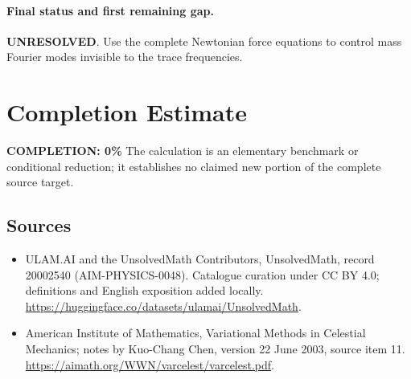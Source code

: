 \documentclass[11pt]{article}
\begin{document}
\paragraph{Final status and first remaining gap.}
\textbf{UNRESOLVED}. Use the complete Newtonian force equations to control mass Fourier modes invisible to the trace frequencies.

\section{Completion Estimate}
\noindent\textbf{COMPLETION: 0\%}
The calculation is an elementary benchmark or conditional reduction; it establishes no claimed new portion of the complete source target.

\subsection{Sources}
\begin{itemize}
\item[\hypertarget{source:20002540:1}{S1}] ULAM.AI and the UnsolvedMath Contributors, UnsolvedMath, record 20002540 (AIM-PHYSICS-0048). Catalogue curation under CC BY 4.0; definitions and English exposition added locally.
\url{https://huggingface.co/datasets/ulamai/UnsolvedMath}.
\item[\hypertarget{source:20002540:2}{S2}] American Institute of Mathematics, Variational Methods in Celestial Mechanics; notes by Kuo-Chang Chen, version 22 June 2003, source item 11.
\url{https://aimath.org/WWN/varcelest/varcelest.pdf}.
\end{itemize}
\label{end:20002540}
\end{document}
